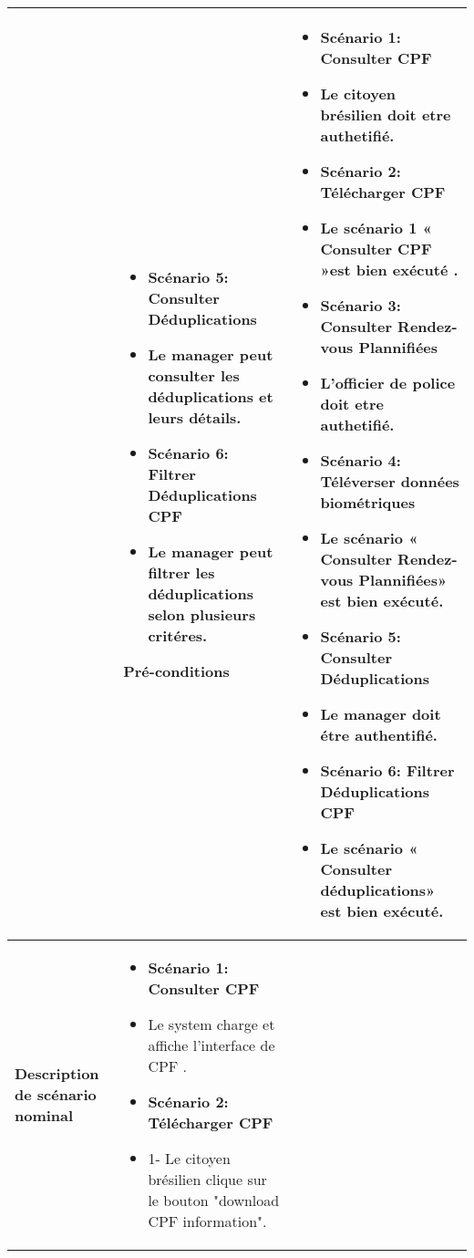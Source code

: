 \begin{longtable}{|>{\arraybackslash}p{4.2cm}|>{\arraybackslash}p{12.5cm}|}
\textbf{}&
\begin{itemize}[label=]
 \item\textbf{Scénario 5: Consulter Déduplications}
  \item Le manager peut consulter les déduplications et leurs détails.
  \item\textbf{Scénario 6: Filtrer Déduplications CPF}
  \item Le manager peut filtrer les déduplications selon plusieurs critéres.
\end{itemize}
\hline
\textbf{Pré-conditions} &
\begin{itemize}[label=]
  \item\textbf{Scénario 1: Consulter CPF}
  \item Le citoyen brésilien doit etre authetifié.
  \item\textbf{Scénario 2: Télécharger CPF}
  \item Le scénario 1  « Consulter CPF »est bien exécuté .
  \item\textbf{Scénario 3: Consulter Rendez-vous Plannifiées}
  \item L'officier de police doit etre authetifié.
  \item\textbf{Scénario 4: Téléverser données biométriques}
  \item Le scénario  « Consulter Rendez-vous Plannifiées» est bien exécuté.
  \item\textbf{Scénario 5: Consulter Déduplications}
  \item Le manager doit étre authentifié.
  \item\textbf{Scénario 6: Filtrer Déduplications CPF}
  \item Le scénario  « Consulter déduplications» est bien exécuté.
 \end{itemize} \\
\hline
\textbf{Description de scénario nominal }  &
\begin{itemize}[label=]
 \item\textbf{Scénario 1: Consulter CPF}
  \item Le system charge et affiche l'interface de CPF .
  \item\textbf{Scénario 2: Télécharger CPF}
  \item 1- Le citoyen brésilien clique sur le bouton "download CPF information".
\end{itemize} \\











\end{longtable}
